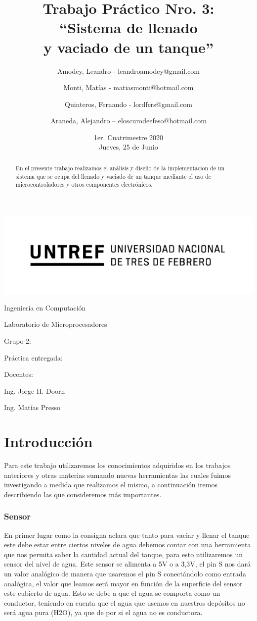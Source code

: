 \documentclass[a4paper]{article}
\title{Trabajo Práctico Nro. 3:\\``Sistema de llenado\\y vaciado de un tanque''}
\author{Amodey, Leandro - leandroamodey@gmail.com
\and Monti, Matías - matiasmonti@hotmail.com
\and Quinteros, Fernando - lordfers@gmail.com
\and Araneda, Alejandro – eloscurodeefeso@hotmail.com}
\date{1er. Cuatrimestre 2020\\Jueves, 25 de Junio}
\def\teacher{Ing. Jorge H. Doorn
\and Ing. Matías Presso}
\begin{document}
\begin{titlepage}\renewcommand\and\par\centering\makeatletter
    \includegraphics{logo.png}\par
    {\Large Ingeniería en Computación \par}\vspace{0.5cm}
    {\LARGE Laboratorio de Microprocesadores \par}\vfill
    {\huge \@title \par}\vfill
    Grupo 2:\par
    \@author\vfill
    Práctica entregada:\par
    \@date\vfill
    Docentes:\par
    \teacher\vspace{1cm}\makeatother
\end{titlepage}

\begin{abstract}

    En el presente trabajo realizamos el análisis y diseño de la
    implementacion de un sistema que se ocupa del llenado y vaciado 
    de un tanque mediante el uso de microcontroladores y otros 
    componentes electrónicos.

\end{abstract}

\section{Introducción}

Para este trabajo utilizaremos los conocimientos adquiridos en los trabajos anteriores y otras materias sumando nuevas herramientas las cuales fuimos investigando a medida que realizamos el mismo, a continuación iremos describiendo las que consideremos más importantes.

\subsubsection*{Sensor}

En primer lugar como la consigna aclara que tanto para vaciar y llenar el tanque este debe estar entre ciertos niveles de agua debemos contar con una herramienta que nos permita saber la cantidad actual del tanque, para esto utilizaremos un sensor del nivel de agua.
Este sensor se alimenta a 5V o a 3,3V, el pin S nos dará un valor analógico de manera que usaremos el pin S conectándolo como entrada analógica, el valor que leamos será mayor en función de la superficie del sensor este cubierto de agua. Esto se debe a que el agua se comporta como un conductor, teniendo en cuenta que el agua que usemos en nuestros depósitos no será agua pura (H2O), ya que de por si el agua no es conductora.
\end{document}
